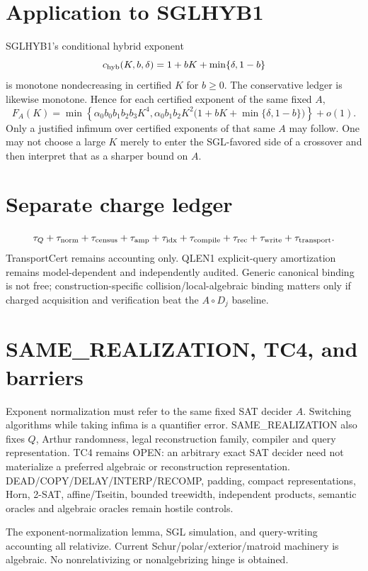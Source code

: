 \documentclass[11pt]{article}
\begin{document}
\section*{Application to SGLHYB1}
SGLHYB1's conditional hybrid exponent
\[
c_{\rm hyb}(K,b,\delta)=1+bK+\min\{\delta,1-b\}
\]
is monotone nondecreasing in certified \(K\) for \(b\ge0\). The conservative ledger is likewise monotone. Hence for each certified exponent of the same fixed \(A\),
\[
\boxed{
F_A(K)=\min\left\{
\alpha_0b_0b_1b_2b_3K^4,
\alpha_0b_1b_2K^2\bigl(1+bK+\min\{\delta,1-b\}\bigr)
\right\}+o(1).
}
\]
Only a justified infimum over certified exponents of that same \(A\) may follow. One may not choose a large \(K\) merely to enter the SGL-favored side of a crossover and then interpret that as a sharper bound on \(A\).

\section*{Separate charge ledger}
\[
\tau_Q+\tau_{\rm norm}+\tau_{\rm census}+\tau_{\rm amp}+\tau_{\rm idx}+\tau_{\rm compile}+\tau_{\rm rec}+\tau_{\rm write}+\tau_{\rm transport}.
\]
TransportCert remains accounting only. QLEN1 explicit-query amortization remains model-dependent and independently audited. Generic canonical binding is not free; construction-specific collision/local-algebraic binding matters only if charged acquisition and verification beat the \(A\circ D_j\) baseline.

\section*{SAME_REALIZATION, TC4, and barriers}
Exponent normalization must refer to the same fixed SAT decider \(A\). Switching algorithms while taking infima is a quantifier error. SAME_REALIZATION also fixes \(Q\), Arthur randomness, legal reconstruction family, compiler and query representation. TC4 remains OPEN: an arbitrary exact SAT decider need not materialize a preferred algebraic or reconstruction representation. DEAD/COPY/DELAY/INTERP/RECOMP, padding, compact representations, Horn, 2-SAT, affine/Tseitin, bounded treewidth, independent products, semantic oracles and algebraic oracles remain hostile controls.

The exponent-normalization lemma, SGL simulation, and query-writing accounting all relativize. Current Schur/polar/exterior/matroid machinery is algebraic. No nonrelativizing or nonalgebrizing hinge is obtained.
\end{document}
